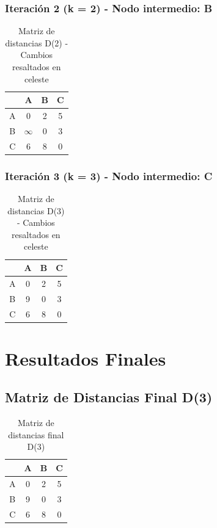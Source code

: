 \documentclass[12pt]{article}
\begin{document}
\subsubsection{Iteración 2 (k = 2) - Nodo intermedio: B}
\begin{table}[h!]
\centering
\begin{tabular}{|c|c|c|c|}
\hline
 & A & B & C \\\hline
A & 0 & 2 & \cellcolor{lightgreen} 5 \\\hline
B & $\infty$ & 0 & 3 \\\hline
C & 6 & 8 & 0 \\\hline
\end{tabular}
\caption{Matriz de distancias D(2) - Cambios resaltados en celeste}
\end{table}

\subsubsection{Iteración 3 (k = 3) - Nodo intermedio: C}
\begin{table}[h!]
\centering
\begin{tabular}{|c|c|c|c|}
\hline
 & A & B & C \\\hline
A & 0 & 2 & 5 \\\hline
B & \cellcolor{lightgreen} 9 & 0 & 3 \\\hline
C & 6 & 8 & 0 \\\hline
\end{tabular}
\caption{Matriz de distancias D(3) - Cambios resaltados en celeste}
\end{table}

\clearpage
\section{Resultados Finales}
\subsection{Matriz de Distancias Final D(3)}
\begin{table}[h!]
\centering
\begin{tabular}{|c|c|c|c|}
\hline
 & A & B & C \\\hline
A & 0 & 2 & 5 \\\hline
B & 9 & 0 & 3 \\\hline
C & 6 & 8 & 0 \\\hline
\end{tabular}
\caption{Matriz de distancias final D(3)}
\end{table}
\end{document}
